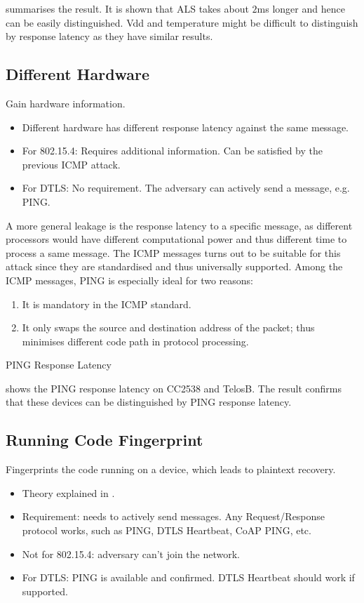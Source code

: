  summarises the result. It is shown that ALS takes about $2$ms longer and hence can be easily distinguished. Vdd and temperature might be difficult to distinguish by response latency as they have similar results.



\subsection{Different Hardware}
Gain hardware information.
\begin{itemize}
	\item Different hardware has different response latency against the same message.
	\item For 802.15.4: Requires additional information. Can be satisfied by the previous ICMP attack.
	\item For DTLS: No requirement. The adversary can actively send a message, e.g. PING.
\end{itemize}

A more general leakage is the response latency to a specific message, as different processors would have different computational power and thus different time to process a same message. The ICMP messages turns out to be suitable for this attack since they are standardised and thus universally supported. Among the ICMP messages, PING is especially ideal for two reasons: 
\begin{enumerate}
	\item It is mandatory in the ICMP standard.
	\item It only swaps the source and destination address of the packet; thus minimises different code path in protocol processing.
\end{enumerate}

\begin{table}
	\center
	
	\caption{PING Response Latency\label{PingResponse}}
\end{table}

 shows the PING response latency on CC2538 and TelosB. The result confirms that these devices can be distinguished by PING response latency.

\subsection{Running Code Fingerprint}
Fingerprints the code running on a device, which leads to plaintext recovery.
\begin{itemize}
	\item Theory explained in .
	\item Requirement: needs to actively send messages. Any Request/Response protocol works, such as PING, DTLS Heartbeat, CoAP PING, etc. 
	\item Not for 802.15.4: adversary can't join the network.
	\item For DTLS: PING is available and confirmed. DTLS Heartbeat should work if supported.
\end{itemize}

